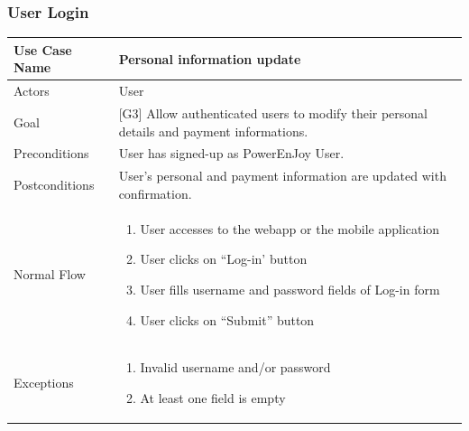\subsubsection{User Login}
\begin{center}
	\begin{tabular}{|l|>{\raggedright}p{10cm}|}
		\hline 
		Use Case Name & Personal information update\tabularnewline
		\hline 
		\hline 
		Actors & User\tabularnewline
		\hline 
		Goal & {[}G3{]} Allow authenticated users to modify their personal details and payment informations.\tabularnewline
		\hline 
		Preconditions & User has signed-up as PowerEnJoy User.\tabularnewline
		\hline 
		Postconditions & User's personal and payment information are updated with confirmation.\tabularnewline
		\hline 
		Normal Flow & \begin{enumerate}
			\item User accesses to the webapp or the mobile application
			\item User clicks on ``Log-in' button
			\item User fills username and password fields of Log-in form
			\item User clicks on ``Submit'' button
		\end{enumerate}
		\tabularnewline
		\hline 
		Exceptions & \begin{enumerate}
			\item Invalid username and/or password
			\item At least one field is empty\end{enumerate}
		\tabularnewline
		\hline 
	\end{tabular}
	\par\end{center}


